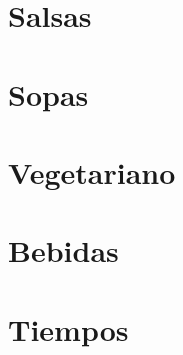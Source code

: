 \documentclass[twoside,12pt]{article}
\begin{document}
\section{Salsas}










\section{Sopas}





\section{Vegetariano}


\section{Bebidas}


\section{Tiempos}

\end{document}
